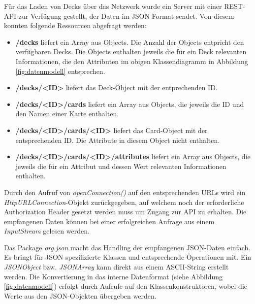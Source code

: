 Für das Laden von Decks über das Netzwerk wurde ein Server mit einer REST-API zur Verfügung gestellt, der Daten im JSON-Format sendet. Von diesem konnten folgende Ressourcen abgefragt werden:
\begin{itemize}
    \item \textbf{/decks} liefert ein Array aus Objects. Die Anzahl der Objects entpricht den verfügbaren Decks. Die Objects enthalten jeweils die für ein Deck relevanten Informationen, die den Attributen im obigen Klassendiagramm in Abbildung \ref{fig:datenmodell} entsprechen.
    \item \textbf{/decks/<ID>} liefert das Deck-Object mit der entprechenden ID.
    \item \textbf{/decks/<ID>/cards} liefert ein Array aus Objects, die jeweils die ID und den Namen einer Karte enthalten.
    \item \textbf{/decks/<ID>/cards/<ID>} liefert das Card-Object mit der entsprechenden ID. Die Attribute in diesem Object nicht enthalten.
    \item \textbf{/decks/<ID>/cards/<ID>/attributes} liefert ein Array aus Objects, die jeweils die für ein Attribut und dessen Wert relevanten Informationen enthalten.
\end{itemize}

Durch den Aufruf von \emph{openConnection()} auf den entsprechenden URLs wird ein \emph{HttpURLConnection}-Objekt zurückgegeben, auf welchem noch der erforderliche Authorization Header gesetzt werden muss um Zugang zur API zu erhalten. Die empfangenen Daten können bei einer erfolgreichen Anfrage aus einem \emph{InputStream} gelesen werden. 

Das Package \emph{org.json} macht das Handling der empfangenen JSON-Daten einfach. Es bringt für JSON spezifizierte Klassen und entsprechende Operationen mit. Ein \emph{JSONObject} bzw. \emph{JSONArray} kann direkt aus einem ASCII-String erstellt werden. Die Konvertierung in das interne Datenformat (siehe Abbildung \ref{fig:datenmodell}) erfolgt durch Aufrufe auf den Klassenkonstruktoren, wobei die Werte aus den JSON-Objekten übergeben werden.